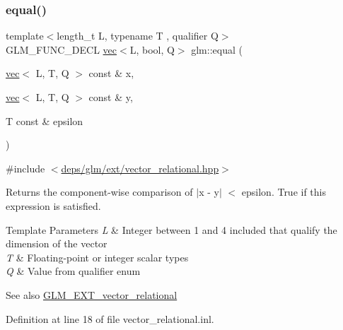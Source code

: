 \subsubsection{\texorpdfstring{equal()}{equal()}\hspace{0.1cm}{\footnotesize\ttfamily [1/3]}}
{\footnotesize\ttfamily template$<$length\+\_\+t L, typename T , qualifier Q$>$ \\
G\+L\+M\+\_\+\+F\+U\+N\+C\+\_\+\+D\+E\+CL \hyperlink{structglm_1_1vec}{vec}$<$L, bool, Q$>$ glm\+::equal (\begin{DoxyParamCaption}\item[{\hyperlink{structglm_1_1vec}{vec}$<$ L, T, Q $>$ const \&}]{x,  }\item[{\hyperlink{structglm_1_1vec}{vec}$<$ L, T, Q $>$ const \&}]{y,  }\item[{T const \&}]{epsilon }\end{DoxyParamCaption})}



{\ttfamily \#include $<$\hyperlink{ext_2vector__relational_8hpp}{deps/glm/ext/vector\+\_\+relational.\+hpp}$>$}

Returns the component-\/wise comparison of $\vert$x -\/ y$\vert$ $<$ epsilon. True if this expression is satisfied.


\begin{DoxyTemplParams}{Template Parameters}
{\em L} & Integer between 1 and 4 included that qualify the dimension of the vector \\
\hline
{\em T} & Floating-\/point or integer scalar types \\
\hline
{\em Q} & Value from qualifier enum\\
\hline
\end{DoxyTemplParams}
\begin{DoxySeeAlso}{See also}
\hyperlink{group__ext__vector__relational}{G\+L\+M\+\_\+\+E\+X\+T\+\_\+vector\+\_\+relational} 
\end{DoxySeeAlso}


Definition at line 18 of file vector\+\_\+relational.\+inl.

\mbox{\label{group__ext__vector__relational_ga6fb2432528edd028e3c2cf5b78d99797}} 
